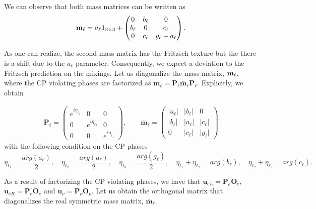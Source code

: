 \documentclass[aps,prd,groupaddress,floatfix,tighten,nofootinbib,showpacs,amsfonts,superscriptaddress]{revtex4-2}
\begin{document}
We can observe that both mass matrices can be written as
\begin{equation}
{\bf m}_{\ell}=a_{\ell}\mathbf{1}_{3\times 3}+\begin{pmatrix}
0 & b_{\ell} & 0 \\ 
b_{\ell} & 0& c_{\ell} \\ 
0 & c_{\ell} & g_{\ell}-a_{\ell}
\end{pmatrix}.
\end{equation}


As one can realize, the second mass matrix has the Fritzsch texture but the there is a shift due to the $a_{\ell}$ parameter. Consequently, we expect a deviation to the Fritzsch prediction on the mixings. Let us diagonalize the mass matrix, ${\bf m}_{\ell}$, where the CP violating phases are factorized as $\mathbf{m}_{\ell}=\mathbf{P}_{\ell}\bar{\mathbf{m}}_{\ell}\mathbf{P_{\ell}}$. Explicitly, we obtain


\begin{eqnarray}
\mathbf{P}_{\ell}=\begin{pmatrix}
e^{i\eta_{\ell_{1}}}& 0 & 0 \\
0 & e^{i\eta_{\ell_{2}}} & 0 \\
0 & 0 & e^{i\eta_{\ell_{3}}}
\end{pmatrix},\qquad \bar{\mathbf{m}}_{\ell}=\begin{pmatrix}
\vert a_{\ell}\vert & \vert b_{\ell}\vert & 0 \\
\vert b_{\ell}\vert & \vert a_{\ell}\vert & \vert c_{\ell}\vert \\
0 & \vert c_{\ell}\vert  & \vert g_{\ell}\vert 
\end{pmatrix}
\end{eqnarray}
with the following condition on the CP phases
\begin{equation}
\eta_{\ell_{1}}=\frac{arg(a_{\ell})}{2},\quad \eta_{\ell_{2}}=\frac{arg(a_{\ell})}{2},\quad \eta_{\ell_{3}}=\frac{arg(g_{\ell})}{2},\quad \eta_{\ell_{1}}+\eta_{\ell_{2}}=arg(b_{\ell}),\quad \eta_{\ell_{2}}+\eta_{\ell_{3}}=arg(c_{\ell}).
\end{equation} 

As a result of factorizing the CP violating phases, we have that $\mathbf{u}_{e L}=\mathbf{P}_{e}\mathbf{O}_{e}$, $\mathbf{u}_{e R}=\mathbf{P}^{\dagger}_{e}\mathbf{O}_{e}$ and  $\mathbf{u}_{\nu}=\mathbf{P}_{\nu}\mathbf{O}_{\nu}$. Let us obtain the orthogonal matrix that diagonalizes the real symmetric mass matrix, $\bar{\mathbf{m}}_{\ell}$. 
\end{document}
